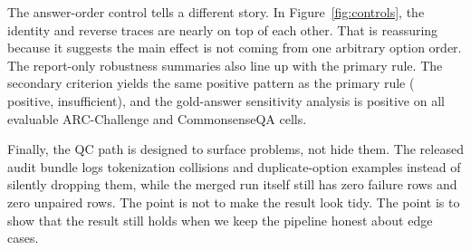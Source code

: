 The answer-order control tells a different story. In Figure~\ref{fig:controls}, the identity
and reverse traces are nearly on top of each other. That is reassuring because it suggests
the main effect is not coming from one arbitrary option order. The report-only robustness
summaries also line up with the primary rule. The secondary criterion yields the same
positive pattern as the primary rule (\OverallSecondaryPositiveCells{} positive,
\OverallSecondaryInsufficientCells{} insufficient), and the gold-answer sensitivity analysis is
positive on all \GoldArcCsqaPositiveCells{} evaluable ARC-Challenge and CommonsenseQA
cells.

Finally, the QC path is designed to surface problems, not hide them. The released audit bundle logs \TokenCollisionCount{} tokenization collisions and \DuplicateOptionCount{} duplicate-option examples instead of silently dropping them, while the merged run itself still has zero failure rows and zero unpaired rows. The point is not to make the result look tidy. The point is to show that the result still holds when we keep the pipeline honest about edge cases.

\FloatBarrier
